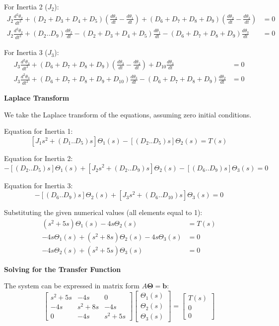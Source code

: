 \documentclass[11pt]{article}
\begin{document}
{For Inertia 2 ($J_2$):}
\begin{align*}
    J_2 \frac{d^2\theta_2}{dt^2} + (D_2+D_3+D_4+D_5)\left(\frac{d\theta_2}{dt} - \frac{d\theta_1}{dt}\right) + (D_6+D_7+D_8+D_9)\left(\frac{d\theta_2}{dt} - \frac{d\theta_3}{dt}\right) &= 0 \\
    J_2 \frac{d^2\theta_2}{dt^2} + (D_2..D_9)\frac{d\theta_2}{dt} - (D_2+D_3+D_4+D_5)\frac{d\theta_1}{dt} - (D_6+D_7+D_8+D_9)\frac{d\theta_3}{dt} &= 0
\end{align*}

{For Inertia 3 ($J_3$):}
\begin{align*}
    J_3 \frac{d^2\theta_3}{dt^2} + (D_6+D_7+D_8+D_9)\left(\frac{d\theta_3}{dt} - \frac{d\theta_2}{dt}\right) + D_{10}\frac{d\theta_3}{dt} &= 0 \\
    J_3 \frac{d^2\theta_3}{dt^2} + (D_6+D_7+D_8+D_9+D_{10})\frac{d\theta_3}{dt} - (D_6+D_7+D_8+D_9)\frac{d\theta_2}{dt} &= 0
\end{align*}

\newpage
\noindent\textbf{Laplace Transform}

\vspace{12pt}

We take the Laplace transform of the equations, assuming zero initial conditions.

\vspace{8pt}

Equation for Inertia 1:
\[
[J_1 s^2 + (D_1..D_5)s]\Theta_1(s) - [(D_2..D_5)s]\Theta_2(s) = T(s)
\]

Equation for Inertia 2:
\[
-[(D_2..D_5)s]\Theta_1(s) + [J_2 s^2 + (D_2..D_9)s]\Theta_2(s) - [(D_6..D_9)s]\Theta_3(s) = 0
\]

Equation for Inertia 3:
\[
-[(D_6..D_9)s]\Theta_2(s) + [J_3 s^2 + (D_6..D_{10})s]\Theta_3(s) = 0
\]

Substituting the given numerical values (all elements equal to 1):
\begin{align}
    (s^2 + 5s)\Theta_1(s) - 4s\Theta_2(s) &= T(s) \tag{1} \\
    -4s\Theta_1(s) + (s^2 + 8s)\Theta_2(s) - 4s\Theta_3(s) &= 0 \tag{2} \\
    -4s\Theta_2(s) + (s^2 + 5s)\Theta_3(s) &= 0 \tag{3}
\end{align}

\noindent\textbf{Solving for the Transfer Function}
\vspace{8pt}

The system can be expressed in matrix form $A\boldsymbol{\Theta} = \mathbf{b}$:
$$ 
\begin{bmatrix} 
s^2 + 5s & -4s & 0 \\ 
-4s & s^2 + 8s & -4s \\ 
0 & -4s & s^2 + 5s 
\end{bmatrix} 
\begin{bmatrix} 
\Theta_1(s) \\ \Theta_2(s) \\ \Theta_3(s) 
\end{bmatrix} 
= 
\begin{bmatrix} 
T(s) \\ 0 \\ 0 
\end{bmatrix} 
$$
\end{document}
